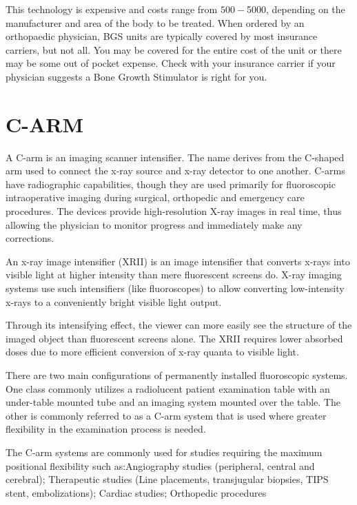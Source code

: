 \documentclass[12pt]{article}
\begin{document}
\indent

This technology is expensive and costs range from $500-$5000, depending on the manufacturer and area of the body to be treated.  When ordered by an orthopaedic physician, BGS units are typically covered by most insurance carriers, but not all.  You may be covered for the entire cost of the unit or there may be some out of pocket expense.  Check with your insurance carrier if your physician suggests a Bone Growth Stimulator is right for you.

\newpage

\section{C-ARM}

A C-arm is an imaging scanner intensifier. The name derives from the C-shaped arm used to connect the x-ray source and x-ray detector to one another. C-arms have radiographic capabilities, though they are used primarily for fluoroscopic intraoperative imaging during surgical, orthopedic and emergency care procedures. The devices provide high-resolution X-ray images in real time, thus allowing the physician to monitor progress and immediately make any corrections.

\indent

An x-ray image intensifier (XRII) is an image intensifier that converts x-rays into visible light at higher intensity than mere fluorescent screens do. X-ray imaging systems use such intensifiers  (like fluoroscopes) to allow converting low-intensity x-rays to a conveniently bright visible light output.

\indent

Through its intensifying effect, the viewer can more easily see the structure of the imaged object than fluorescent screens alone. The XRII requires lower absorbed doses due to more efficient conversion of x-ray quanta to visible light.

\indent

There are two main configurations of permanently installed fluoroscopic systems. One class commonly utilizes a radiolucent patient examination table with an under-table mounted tube and an imaging system mounted over the table. The other is commonly referred to as a C-arm system that is used where greater flexibility in the examination process is needed.

\indent

The C-arm systems are commonly used for studies requiring the maximum positional flexibility such as:Angiography studies (peripheral, central and cerebral);
Therapeutic studies (Line placements, transjugular biopsies, TIPS stent, embolizations);
Cardiac studies;
Orthopedic procedures
\end{document}
